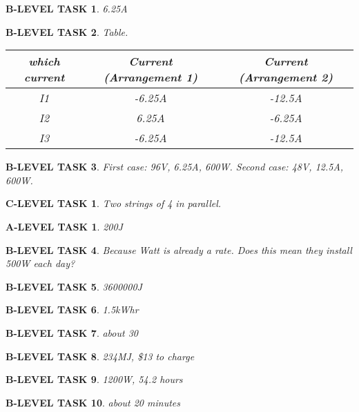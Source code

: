 \documentclass{book}
\numberwithin{equation}{section}
\newtheorem{alevel}{A-LEVEL TASK}
\newtheorem{blevel}{B-LEVEL TASK}
\newtheorem{clevel}{C-LEVEL TASK}
\theoremstyle{definition}
\begin{document}
\begin{blevel}6.25A\end{blevel}

\begin{blevel} Table.\par
\begin{table}[H]
\begin{center}
\begin{tabular}{|c|c|c|}\hline
which current	& Current (Arrangement 1)&Current (Arrangement 2) \\ \hline
I1 & -6.25A& -12.5A\\ \hline
I2 & 6.25A& -6.25A\\ \hline
I3 & -6.25A& -12.5A\\ \hline
\end{tabular}
\label{T:2SSC}
\end{center}
\end{table}
\end{blevel}

\begin{blevel}First case: 96V, 6.25A, 600W. Second case: 48V, 12.5A, 600W.\end{blevel}
\begin{clevel}Two strings of 4 in parallel.\end{clevel}

\begin{alevel}200J\end{alevel}
\begin{blevel}Because Watt is already a rate. Does this mean they install 500W each day?\end{blevel}
\begin{blevel}3600000J\end{blevel}
\begin{blevel}1.5kWhr\end{blevel}
\begin{blevel}about 30\end{blevel}
\begin{blevel}234MJ, \$13 to charge\end{blevel}
\begin{blevel}1200W, 54.2 hours\end{blevel}
\begin{blevel}about 20 minutes\end{blevel}
\end{document}
